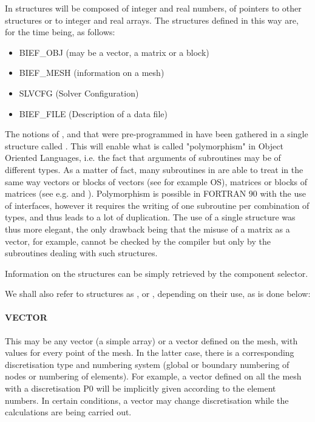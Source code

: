 In \bief structures will be composed of integer and real numbers, of pointers to
other structures or to integer and real arrays. The structures defined in this
way are, for the time being, as follows:
\begin{itemize}
\item BIEF\_OBJ (may be a vector, a matrix or a block)
\item BIEF\_MESH (information on a mesh)
\item SLVCFG (Solver Configuration)
\item BIEF\_FILE (Description of a data file)
\end{itemize}
The notions of ,  and  that were
pre-programmed in  have been gathered in a single structure called
. This will enable what is called "polymorphism" in Object
Oriented Languages, i.e. the fact that arguments of subroutines may be of
different types. As a matter of fact, many subroutines in \bief are able to
treat in the same way vectors or blocks of vectors (see for example OS),
matrices or blocks of matrices (see e.g.  and ).
Polymorphism is possible in FORTRAN 90 with the use of interfaces, however it
requires the writing of one subroutine per combination of types, and thus leads
to a lot of duplication. The use of a single structure  was
thus more elegant, the only drawback being that the misuse of a matrix as a
vector, for example, cannot be checked by the compiler but only by the
subroutines dealing with such structures.


Information on the structures can be simply retrieved by the component
selector.


We shall also refer to  structures as ,
 or , depending on their use, as is done below:

\paragraph{VECTOR}

This may be any vector (a simple array) or a vector defined on the mesh, with
values for every point of the mesh. In the latter case, there is a
corresponding discretisation type and numbering system (global or boundary
numbering of nodes or numbering of elements). For example, a vector defined on
all the mesh with a discretisation P0 will be implicitly given according to the
element numbers. In certain conditions, a vector may change discretisation
while the calculations are being carried out.

